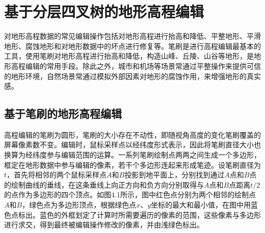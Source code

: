 
\chapter{基于分层四叉树的地形高程编辑}
对地形高程数据的常见编辑操作包括对地形高程进行抬高和降低、平整地形、平滑地形、腐蚀地形和对地形数据中的坏点进行修复等。笔刷是进行高程编辑最基本的工具，使用笔刷对地形高程进行抬高和降低，构造山峰、丘陵、山谷等地形，是地形高程编辑的常用手段。除此之外，城市和机场等场景常通过平整操作来提供可信的地形环境，自然场景常通过模拟外部因素对地形的腐蚀作用，来增强地形的真实感。\par
\section{基于笔刷的地形高程编辑}
高程编辑的笔刷为圆形，笔刷的大小存在不动性，即随视角高度的变化笔刷覆盖的屏幕像素数不变。编辑时，鼠标采样点以经纬度形式表示，因此将笔刷直径大小也换算为经纬度参与编辑范围的运算。一系列笔刷绘制点两两之间生成一个多边形，框定在地形数据中参与编辑的像素，若干个多边形连起来形成笔迹。设笔刷直径为$t$，首先将相邻的两个鼠标采样点$A$和$B$投影到地平面上，分别找到通过$A$点和$B$点的绘制曲线的垂线，在这条垂线上向正方向和负方向分别取得与$A$点和$B$点距离$t/2$的点作为多边形的四个顶点。如图4.1所示，图中红色点分别为两个相邻的绘制点$A$和$B$，绿色点为多边形顶点，根据绿色点$x$、$y$坐标的最大和最小值，在图中用蓝色点标出。蓝色的外框划定了计算时所需要遍历的像素的范围，这些像素与多边形进行求交，得到最终被编辑操作修改的像素，并由浅绿色标出。\par


